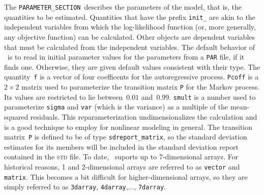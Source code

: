 \documentclass{admbmanual}
\newcommand\PS{\texttt{PARAMETER\_SECTION}}
\begin{document}
The \PS\ describes the parameters of the model, that is, the quantities
to be estimated. Quantities that have the prefix \texttt{init\_}
are akin to the independent variables from which the log-likelihood
function (or, more generally, any objective function) can be calculated.
Other objects are dependent variables that must be calculated from the
independent variables. The default behavior of \ADM\ is to read in
initial parameter values for the parameters from a \texttt{PAR} file, if
it finds one. Otherwise, they are given default values consistent with their
type.
The quantity~\texttt{f} is a vector of four coefficents for the autoregressive
process. \texttt{Pcoff} is a $2\times 2$ matrix used to parameterize
the transition matrix \texttt{P} for the Markov process. Its values are restricted to lie
between~$0.01$ and~$0.99$. \texttt{smult} is a number used to parameterize 
\texttt{sigma} and \texttt{var} (which is the variance) as a multiple of the
mean-squared residuals. This reparameterization undimensionalizes the
calculation and is a good  technique to employ for nonlinear modeling
in general. The transition matrix~\texttt{P} is defined to be of 
type \texttt{sdreport\_matrix}, so the standard deviation estimates
for its members will be included in the standard deviation report contained
in the \textsc{std} file. To date, \ADM\ suports up to 7-dimensional arrays. 
For historical reasons, 1 and 2-dimensional
arrays are referred to as \texttt{vector} and \texttt{matrix}. This becomes a
bit difficult for higher-dimensional arrays, so they are simply referred
to as \texttt{3darray}, \texttt{4darray},$\ldots$, \texttt{7darray}.
\end{document}
